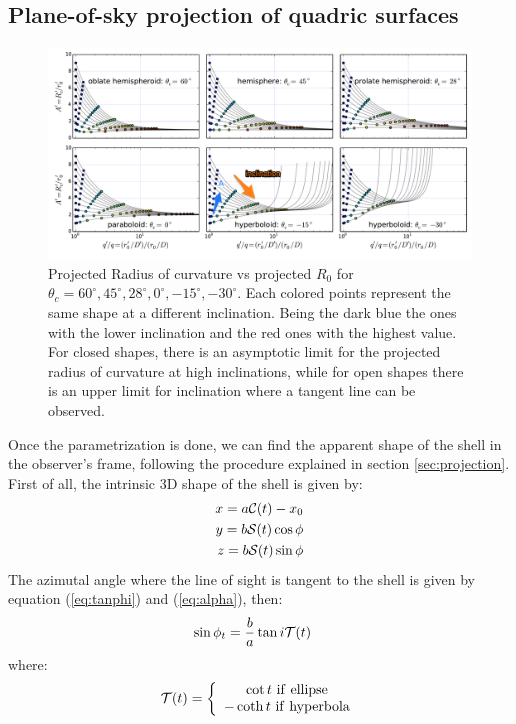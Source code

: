 \subsection{Plane-of-sky projection of quadric surfaces} 
\begin{figure}
\includegraphics[width=0.9\linewidth]{annotated}
\caption{Projected Radius of curvature vs projected $R_0$ for $\theta_c=60^\circ,45^\circ,28^\circ, 0^\circ,-15^\circ,-30^\circ$. Each colored points represent
the same shape at a different inclination. Being the dark blue the ones with the lower inclination and the red ones with the highest value. For closed shapes, there is
an asymptotic limit for the projected radius of curvature at high inclinations, while for open shapes there is an upper limit for inclination where a tangent line can be observed.}
\label{fig:Apqp}
\end{figure}

Once the parametrization is done, we can find the apparent shape of
the shell in the observer's frame, following the procedure explained
in section \ref{sec:projection}.  First of all, the intrinsic 3D shape of the shell is given by:
\begin{align}
x = a\mathcal{C}(t)-x_0 \\ 
y = b\mathcal{S}(t)\cos\phi \\
z =  b\mathcal{S}(t)\sin\phi
\end{align}
The azimutal angle where the line of sight is tangent to the shell is given by equation (\ref{eq:tanphi}) and (\ref{eq:alpha}), then:
\begin{align}
\sin\phi_t &= \frac{b}{a}\tan i\mathcal{T}(t) 
\end{align}
where:
\begin{align}
\mathcal{T}(t) = \left\lbrace \begin{array}{c}
\cot t ~\mathrm{if~ellipse} \\
-\coth t ~\mathrm{if~hyperbola}
\end{array}\right.
\end{align}

